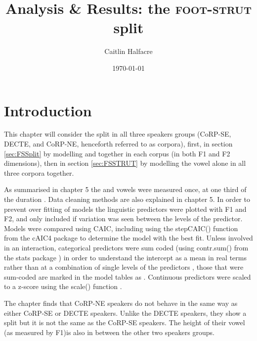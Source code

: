 \documentclass[../../../00.FullDoc/tex/APRReport-year4]{subfiles}
\title{Analysis \& Results: the \textsc{foot}-\textsc{strut} split}
\author{Caitlin Halfacre}
\date{\today}
\begin{document}
	\newcommand{\onlyinsubfile}[1]{#1}
	\newcommand{\notinsubfile}[1]{}
		\maketitle
		\pagebreak
		\tableofcontents
		\onehalfspacing
	\pagestyle{scrheadings}
	
\section{Introduction} \label{sec:FSintro}

This chapter will consider the \FS{} split in all three speakers groups (CoRP-SE, DECTE, and CoRP-NE, henceforth referred to as corpora), first, in section \ref{sec:FSSplit} by modelling \foot{} and \strutt{} together in each corpus (in both F1 and F2 dimensions), then in section \ref{sec:FSSTRUT} by modelling the \strutt{} vowel alone in all three corpora together.

As summarised in chapter \onlyinsubfile{5}\notinsubfile{\ref{ch:Methodology}} the \foot{} and \strutt{} vowels were measured once, at one third of the duration \citep{FAVE}. Data cleaning methods are also explained in chapter \onlyinsubfile{5}\notinsubfile{\ref{ch:Methodology}}.
In order to prevent over fitting of models the linguistic predictors were plotted with F1 and F2, and only included if variation was seen between the levels of the predictor. Models were compared using CAIC, including using the stepCAIC() function from the cAIC4 package \citep{cAIC4} to determine the model with the best fit. Unless involved in an interaction, categorical predictors were sum coded (using contr.sum() from the stats package \citealt{RCoreTeam2021}) in order to understand the intercept as a mean in real terms rather than at a combination of single levels of the predictors \cite{Winter2019}, those that were sum-coded are marked in the model tables as . Continuous predictors were scaled to a z-score using the scale() function \citep{RCoreTeam2021}.

The chapter finds that CoRP-NE speakers do not behave in the same way as either CoRP-SE or DECTE speakers. Unlike the DECTE speakers, they show a split but it is not the same as the CoRP-SE speakers. The height of their \strutt{} vowel (as measured by F1)is also in between the other two speakers groups.
 
\end{document}
